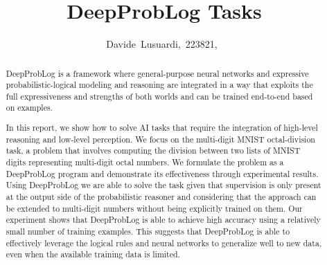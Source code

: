 \documentclass[journal]{IEEEtran}
\begin{document}
%
\title{DeepProbLog Tasks}
%
%
%

\author{Davide~Lusuardi,~223821,~%
}


\maketitle

\begin{abstract}
  DeepProbLog is a framework where general-purpose neural networks and expressive probabilistic-logical modeling and reasoning are integrated in a way that exploits the full expressiveness and strengths of both worlds and can be trained end-to-end based on examples.

  In this report, we show how to solve AI tasks that require the integration of high-level reasoning and low-level perception. We focus on the multi-digit MNIST octal-division task, a problem that involves computing the division between two lists of MNIST digits representing multi-digit octal numbers. We formulate the problem as a DeepProbLog program and demonstrate its effectiveness through experimental results. Using DeepProbLog we are able to solve the task given that supervision is only present at the output side of the probabilistic reasoner and considering that the approach can be extended to multi-digit numbers without being explicitly trained on them. Our experiment shows that DeepProbLog is able to achieve high accuracy using a relatively small number of training examples. This suggests that DeepProbLog is able to effectively leverage the logical rules and neural networks to generalize well to new data, even when the available training data is limited. 
\end{abstract}
\end{document}

